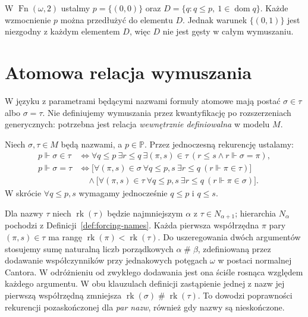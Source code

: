 \begin{przyklad}
\label{ex:forcing33-local}
W $\operatorname{Fn}(\omega,2)$ ustalmy
$p=\{(0,0)\}$ oraz
$D=\{q:q\leq p,\ 1\in\operatorname{dom}q\}$.
Każde wzmocnienie $p$ można przedłużyć
do elementu $D$. Jednak warunek
$\{(0,1)\}$ jest niezgodny z każdym
elementem $D$, więc $D$ nie jest
gęsty w całym wymuszaniu.
\end{przyklad}

\section{Atomowa relacja wymuszania}
W języku z parametrami będącymi nazwami
formuły atomowe mają postać $\sigma\in\tau$
albo $\sigma=\tau$. Nie definiujemy
wymuszania przez kwantyfikację po
rozszerzeniach generycznych: potrzebna
jest relacja \emph{wewnętrznie definiowalna}
w modelu $M$.

\begin{definicja}
\label{def:forcing33-atomic}
Niech $\sigma,\tau\in M$ będą nazwami,
a $p\in\mathbb P$. Przez jednoczesną
rekurencję ustalamy:
\[
\begin{aligned}
p\Vdash\sigma\in\tau
&\iff\forall q\leq p\ \exists r\leq q\
 \exists(\pi,s)\in\tau\
 (r\leq s\land r\Vdash\sigma=\pi),\\
p\Vdash\sigma=\tau
&\iff
 \bigl[\forall(\pi,s)\in\sigma\
  \forall q\leq p,s\
  \exists r\leq q\ (r\Vdash\pi\in\tau)\bigr]\\
&\quad{}\land
 \bigl[\forall(\pi,s)\in\tau\
  \forall q\leq p,s\
  \exists r\leq q\ (r\Vdash\pi\in\sigma)\bigr].
\end{aligned}
\]
W skrócie $\forall q\leq p,s$ wymagamy
jednocześnie $q\leq p$ i $q\leq s$.
\end{definicja}

\begin{uwaga}[Dobrze ufundowana rekurencja]
\label{rem:forcing33-ranks}
Dla nazwy $\tau$ niech
$\operatorname{rk}(\tau)$ będzie
najmniejszym $\alpha$ z
$\tau\in N_{\alpha+1}$; hierarchia $N_\alpha$
pochodzi z Definicji~\ref{def:forcing-names}.
Każda pierwsza współrzędna $\pi$
pary $(\pi,s)\in\tau$ ma rangę
$\operatorname{rk}(\pi)
<\operatorname{rk}(\tau)$.
Do uszeregowania dwóch argumentów
stosujemy sumę naturalną liczb
porządkowych $\alpha\mathbin{\#}\beta$,
zdefiniowaną przez dodawanie współczynników
przy jednakowych potęgach $\omega$
w postaci normalnej Cantora.
W odróżnieniu od zwykłego dodawania
jest ona ściśle rosnąca względem
każdego argumentu. W obu klauzulach
definicji zastąpienie jednej z nazw
jej pierwszą współrzędną zmniejsza
$\operatorname{rk}(\sigma)
\mathbin{\#}\operatorname{rk}(\tau)$.
To dowodzi poprawności rekurencji
pozaskończonej dla \emph{par nazw},
również gdy nazwy są nieskończone.
\end{uwaga}

